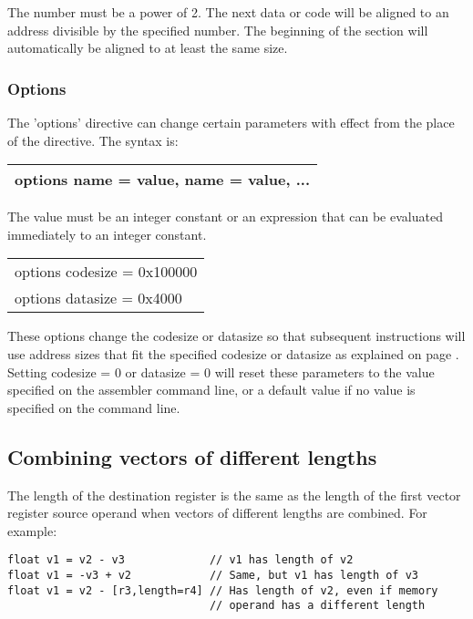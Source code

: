 \documentclass[forwardcom.tex]{subfiles}
\begin{document}
The number must be a power of 2. The next data or code will be aligned to an address divisible by the specified number. The beginning of the section will automatically be aligned to at least the same size.
\vv


\subsubsection{Options} \label{optionsDirective}
The 'options' directive can change certain parameters with effect from the place of the directive. The syntax is:
\vv

\begin{tabular}{|p{150mm}|}
\hline
\hspace{4mm} options name = value, name = value, ...\\
\hline
\end{tabular}
\vv

The value must be an integer constant or an expression that can be evaluated immediately to an integer constant.
\vv

\begin{tabular}{|p{150mm}|}
\hline
\hspace{4mm} options codesize = 0x100000 \\
\hspace{4mm} options datasize = 0x4000 \\
\hline
\end{tabular}
\vv

These options change the codesize or datasize so that subsequent instructions
will use address sizes that fit the specified codesize or datasize as explained on page \pageref{SpecifyDataSize}. Setting codesize = 0 or datasize = 0 will reset these parameters to the value specified on the assembler command line, or a default value if no value is specified on the command line.
\vv


\subsection{Combining vectors of different lengths} \label{vectorsDifferentLengths}

The length of the destination register is the same as the length of the first vector register source operand when vectors of different lengths are combined. For example:
\vv

\begin{lstlisting}[frame=single]
float v1 = v2 - v3             // v1 has length of v2
float v1 = -v3 + v2            // Same, but v1 has length of v3
float v1 = v2 - [r3,length=r4] // Has length of v2, even if memory
                               // operand has a different length
\end{lstlisting}
\vspace{4mm}
\end{document}
